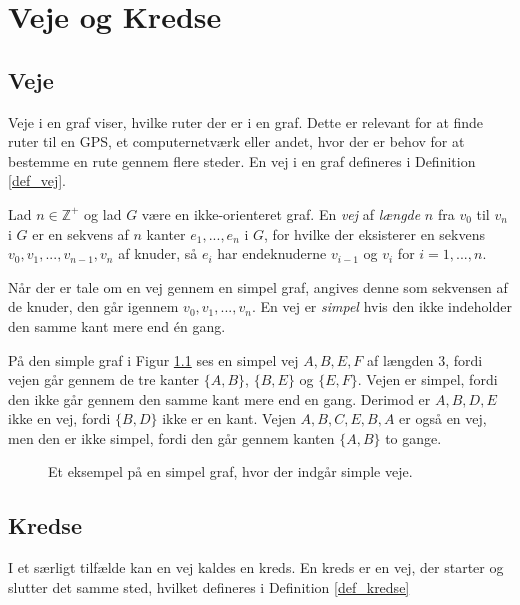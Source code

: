 \chapter{Veje og Kredse} \label{chap:paths_and_circuts}

\section{Veje}
Veje i en graf viser, hvilke ruter der er i en graf. Dette er relevant for at finde ruter til en GPS, et computernetværk eller andet, hvor der er behov for at bestemme en rute gennem flere steder. 
En vej i en graf defineres i Definition \ref{def_vej}.

\begin{defn} \label{def_vej}
	Lad $n \in  \mathbb{Z}^{+}$ og lad $G$ være en ikke-orienteret graf. 
	En \textit{vej} af \textit{længde} $n$ fra $v_0$ til $v_n$ i $G$ er en sekvens af $n$ kanter $e_1, ..., e_n$ i $G$, for hvilke der eksisterer en sekvens $v_0,v_1,...,v_{n-1},v_n$ af knuder, så $e_i$ har endeknuderne $v_{i-1}$ og $v_i$ for $i=1,...,n$.
\end{defn}

Når der er tale om en vej gennem en simpel graf, angives denne som sekvensen af de knuder, den går igennem $v_0, v_1,...,v_n$. 
En vej er \textit{simpel} hvis den ikke indeholder den samme kant mere end én gang. 

\begin{exmp} \label{ex_vej}
	På den simple graf i Figur \ref{graf_vej} ses en simpel vej $A,B,E,F$ af længden 3, fordi vejen går gennem de tre kanter $\lbrace A,B \rbrace$, $\lbrace B,E \rbrace$ og $\lbrace E,F \rbrace$. 
	Vejen er simpel, fordi den ikke går gennem den samme kant mere end en gang. 
	Derimod er $A,B,D,E$ ikke en vej, fordi $\lbrace B,D \rbrace$ ikke er en kant. 
	Vejen $A,B,C,E,B,A$ er også en vej, men den er ikke simpel, fordi den går gennem kanten $\lbrace A,B \rbrace$ to gange. 
\end{exmp}

\begin{figure}[h]
	\centering
	
	\caption{Et eksempel på en simpel graf, hvor der indgår simple veje.} \label{graf_vej}
\end{figure}

\section{Kredse}
I et særligt tilfælde kan en vej kaldes en kreds.
En kreds er en vej, der starter og slutter det samme sted, hvilket defineres i Definition \ref{def_kredse}

